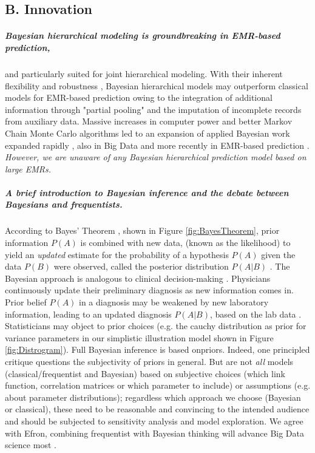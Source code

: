 \documentclass[11pt,notitlepage]{article}
\begin{document}
\subsection*{B. Innovation}

\subparagraph*{Bayesian hierarchical modeling is groundbreaking in EMR-based prediction,} and particularly suited for joint hierarchical modeling. With their inherent flexibility and robustness \cite{Carlin_1349763,Sutton_2012}, Bayesian hierarchical models may outperform classical models for EMR-based prediction owing to the integration of additional information through "partial pooling" \cite{Gelman_red_2009} and the imputation of incomplete records from auxiliary data. Massive increases in computer power and better Markov Chain Monte Carlo algorithms led to an expansion of applied Bayesian work expanded rapidly \cite{Ashby_16947924,Spiegelhalter_11134920}, also in Big Data \cite{Efron_largescale_2010,Yoo_24987556} and more recently in EMR-based prediction \cite{Himes_19261943,Ryynaenen_23496851,Wu_20473190}. \textit{However, we are unaware of any Bayesian hierarchical prediction model based on large EMRs.} 

\subparagraph{A brief introduction to Bayesian inference and the debate between Bayesians and frequentists.} According to Bayes' Theorem \cite{Thomas_Bayes}, shown in Figure \ref{fig:BayesTheorem}, prior information $P(A)$ is combined with new data, (known as the likelihood) to yield an \textit{updated} estimate for the probability of a hypothesis $P(A)$ given the data $P(B)$ were observed, called the posterior distribution $P(A|B)$ \cite{Kruschke_Book_2014}. The Bayesian approach is analogous to clinical decision-making \cite{Spiegelhalter_11134920}. Physicians continuously update their preliminary diagnosis as new information comes in. Prior belief $P(A)$ in a diagnosis may be weakened by new laboratory information, leading to an updated diagnosis $P(A|B)$, based on the lab data \cite{Kruschke_22774788}. Statisticians may object to prior choices (e.g. the cauchy distribution as prior for variance parameters \cite{Gelman_Cauchy_2006} in our simplistic illustration model shown in Figure \ref{fig:Distrogram}). Full Bayesian inference is based onpriors. Indeed, one principled critique questions the subjectivity of priors in general. But are not \textit{all} models (classical/frequentist and Bayesian) based on subjective choices \cite{Wagenmakers_Bayesian_v_Freq_2008} (which link function, correlation matrices or which parameter to include) or assumptions (e.g. about parameter distributions); regardless which approach we choose (Bayesian or classical), these need to be reasonable and convincing to the intended audience and should be subjected to sensitivity analysis and model exploration. We agree with Efron, combining frequentist with Bayesian thinking will advance Big Data science most \cite{Efron_Bayes_v_Freqentisit,Efron_largescale_2010}. 
\end{document}
